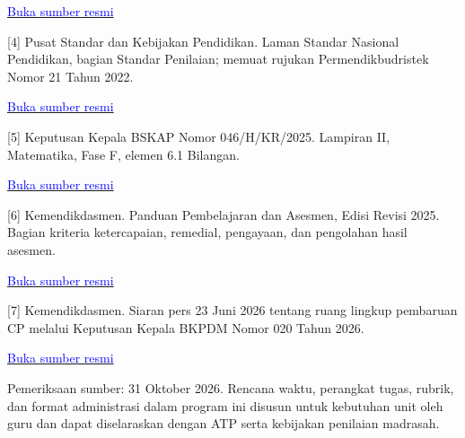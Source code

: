 \documentclass[11pt,a4paper]{article}
\begin{document}
\href{https://jdih.kemendikdasmen.go.id/sjdih/siperpu/dokumen/abstraksi/Abstrak%20RPM%20Standar%20Proses.pdf}{\small\textcolor{blue}{Buka sumber resmi}}\par
\vspace{8.50393701pt}
[4] Pusat Standar dan Kebijakan Pendidikan. Laman Standar Nasional Pendidikan, bagian Standar Penilaian; memuat rujukan Permendikbudristek Nomor 21 Tahun 2022.\par\medskip
\href{https://pskp.kemendikdasmen.go.id/standar-nasional-pendidikan-a/standar-proses}{\small\textcolor{blue}{Buka sumber resmi}}\par
\vspace{8.50393701pt}
[5] Keputusan Kepala BSKAP Nomor 046/H/KR/2025. Lampiran II, Matematika, Fase F, elemen 6.1 Bilangan.\par\medskip
\href{https://bpmpbabel.kemendikdasmen.go.id/PPID/wp-content/uploads/2025/07/KepKaBSKAP-046_2025-ttg-CP.pdf}{\small\textcolor{blue}{Buka sumber resmi}}\par
\vspace{8.50393701pt}
[6] Kemendikdasmen. Panduan Pembelajaran dan Asesmen, Edisi Revisi 2025. Bagian kriteria ketercapaian, remedial, pengayaan, dan pengolahan hasil asesmen.\par\medskip
\href{https://kurikulum.kemendikdasmen.go.id/file/1755668120_manage_file.pdf}{\small\textcolor{blue}{Buka sumber resmi}}\par
\vspace{8.50393701pt}
[7] Kemendikdasmen. Siaran pers 23 Juni 2026 tentang ruang lingkup pembaruan CP melalui Keputusan Kepala BKPDM Nomor 020 Tahun 2026.\par\medskip
\href{https://www.kemendikdasmen.go.id/siaran-pers/15636-capaian-pembelajaran-baru-telah-terbit-yang-berubah-hanya-mata-pelajaran-agama-dan-budi-pekerti}{\small\textcolor{blue}{Buka sumber resmi}}\par
\vspace{8.50393701pt}
{\small Pemeriksaan sumber: 31 Oktober 2026. Rencana waktu, perangkat tugas, rubrik, dan format administrasi dalam program ini disusun untuk kebutuhan unit oleh guru dan dapat diselaraskan dengan ATP serta kebijakan penilaian madrasah.\par}\medskip
\end{document}
